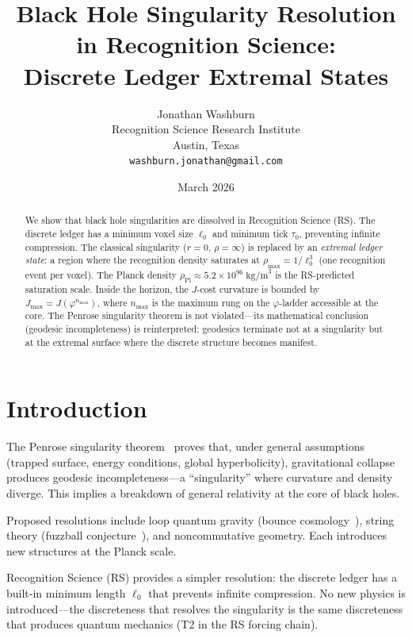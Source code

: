 \documentclass[12pt,a4paper]{article}
\title{Black Hole Singularity Resolution in Recognition Science:\\
Discrete Ledger Extremal States}
\author{Jonathan Washburn\\
Recognition Science Research Institute\\
Austin, Texas\\
\texttt{washburn.jonathan@gmail.com}}
\date{March 2026}
\theoremstyle{definition}
\theoremstyle{remark}
\begin{document}
\maketitle

\begin{abstract}
We show that black hole singularities are dissolved in Recognition
Science (RS).  The discrete ledger has a minimum voxel size $\ell_0$
and minimum tick $\tau_0$, preventing infinite compression.  The
classical singularity ($r = 0$, $\rho = \infty$) is replaced by an
\emph{extremal ledger state}: a region where the recognition density
saturates at $\rho_{\max} = 1/\ell_0^3$ (one recognition event per
voxel).  The Planck density
$\rho_{\mathrm{Pl}} \approx 5.2 \times 10^{96}\;\mathrm{kg/m}^3$ is
the RS-predicted saturation scale.  Inside the horizon, the $J$-cost
curvature is bounded by $J_{\max} = J(\varphi^{n_{\max}})$, where
$n_{\max}$ is the maximum rung on the $\varphi$-ladder accessible at
the core.  The Penrose singularity theorem is not violated---its
mathematical conclusion (geodesic incompleteness) is reinterpreted:
geodesics terminate not at a singularity but at the extremal surface
where the discrete structure becomes manifest.
\end{abstract}

\section{Introduction}

The Penrose singularity theorem~\cite{Penrose1965} proves that, under
general assumptions (trapped surface, energy conditions, global
hyperbolicity), gravitational collapse produces geodesic
incompleteness---a ``singularity'' where curvature and density diverge.
This implies a breakdown of general relativity at the core of black
holes.

Proposed resolutions include loop quantum gravity (bounce
cosmology~\cite{Ashtekar2006}), string theory (fuzzball
conjecture~\cite{Mathur2005}), and noncommutative geometry.  Each
introduces new structures at the Planck scale.

Recognition Science (RS) provides a simpler resolution: the
discrete ledger has a built-in minimum length $\ell_0$ that
prevents infinite compression.  No new physics is
introduced---the discreteness that resolves the singularity is
the same discreteness that produces quantum mechanics (T2 in
the RS forcing chain).
\end{document}
